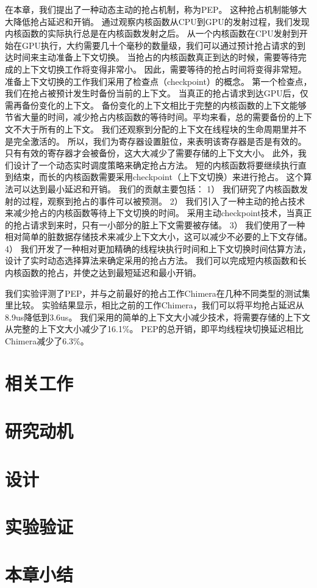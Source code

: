 在本章，我们提出了一种动态主动的抢占机制，称为PEP。
这种抢占机制能够大大降低抢占延迟和开销。
通过观察内核函数从CPU到GPU的发射过程，我们发现内核函数的实际执行总是在内核函数发射之后。
从一个内核函数在CPU发射到开始在GPU执行，大约需要几十个毫秒的数量级，我们可以通过预计抢占请求的到达时间来主动准备上下文切换。
当抢占的内核函数真正到达的时候，需要等待完成的上下文切换工作将变得非常小。
因此，需要等待的抢占时间将变得非常短。准备上下文切换的工作我们采用了检查点（checkpoint）的概念。
第一个检查点，我们在抢占被预计发生时备份当前的上下文。
当真正的抢占请求到达GPU后，仅需再备份变化的上下文。
备份变化的上下文相比于完整的内核函数的上下文能够节省大量的时间，减少抢占内核函数的等待时间。平均来看，总的需要备份的上下文不大于所有的上下文。
我们还观察到分配的上下文在线程块的生命周期里并不是完全激活的。
所以，我们为寄存器设置脏位，来表明该寄存器是否是有效的。
只有有效的寄存器才会被备份，这大大减少了需要存储的上下文大小。
此外，我们设计了一个动态实时调度策略来确定抢占方法。
短的内核函数将要继续执行直到结束，而长的内核函数需要采用checkpoint（上下文切换）来进行抢占。
这个算法可以达到最小延迟和开销。
我们的贡献主要包括：
1）	我们研究了内核函数发射的过程，观察到抢占的事件可以被预测。
2）	我们引入了一种主动的抢占技术来减少抢占的内核函数等待上下文切换的时间。
采用主动checkpoint技术，当真正的抢占请求到来时，只有一小部分的脏上下文需要被存储。
3）	我们使用了一种相对简单的脏数据存储技术来减少上下文大小，这可以减少不必要的上下文存储。
4）	我们开发了一种相对更加精确的线程块执行时间和上下文切换时间估算方法，设计了实时动态选择算法来确定采用的抢占方法。
我们可以完成短内核函数和长内核函数的抢占，并使之达到最短延迟和最小开销。

我们实验评测了PEP，并与之前最好的抢占工作Chimera在几种不同类型的测试集里比较。
实验结果显示，相比之前的工作Chimera，我们可以将平均抢占延迟从8.9us降低到3.6us。
我们采用的简单的上下文大小减少技术，将需要存储的上下文从完整的上下文大小减少了16.1\%。
PEP的总开销，即平均线程块切换延迟相比Chimera减少了6.3\%。




\section{相关工作}

\section{研究动机}


\section{设计}

\section{实验验证}

\section{本章小结}

